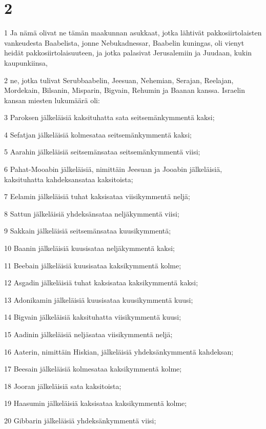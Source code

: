 \chapter{2}

\par 1 Ja nämä olivat ne tämän maakunnan asukkaat, jotka lähtivät pakkosiirtolaisten vankeudesta Baabelista, jonne Nebukadnessar, Baabelin kuningas, oli vienyt heidät pakkosiirtolaisuuteen, ja jotka palasivat Jerusalemiin ja Juudaan, kukin kaupunkiinsa,
\par 2 ne, jotka tulivat Serubbaabelin, Jeesuan, Nehemian, Serajan, Reelajan, Mordekain, Bilsanin, Misparin, Bigvain, Rehumin ja Baanan kanssa. Israelin kansan miesten lukumäärä oli:
\par 3 Paroksen jälkeläisiä kaksituhatta sata seitsemänkymmentä kaksi;
\par 4 Sefatjan jälkeläisiä kolmesataa seitsemänkymmentä kaksi;
\par 5 Aarahin jälkeläisiä seitsemänsataa seitsemänkymmentä viisi;
\par 6 Pahat-Mooabin jälkeläisiä, nimittäin Jeesuan ja Jooabin jälkeläisiä, kaksituhatta kahdeksansataa kaksitoista;
\par 7 Eelamin jälkeläisiä tuhat kaksisataa viisikymmentä neljä;
\par 8 Sattun jälkeläisiä yhdeksänsataa neljäkymmentä viisi;
\par 9 Sakkain jälkeläisiä seitsemänsataa kuusikymmentä;
\par 10 Baanin jälkeläisiä kuusisataa neljäkymmentä kaksi;
\par 11 Beebain jälkeläisiä kuusisataa kaksikymmentä kolme;
\par 12 Asgadin jälkeläisiä tuhat kaksisataa kaksikymmentä kaksi;
\par 13 Adonikamin jälkeläisiä kuusisataa kuusikymmentä kuusi;
\par 14 Bigvain jälkeläisiä kaksituhatta viisikymmentä kuusi;
\par 15 Aadinin jälkeläisiä neljäsataa viisikymmentä neljä;
\par 16 Aaterin, nimittäin Hiskian, jälkeläisiä yhdeksänkymmentä kahdeksan;
\par 17 Beesain jälkeläisiä kolmesataa kaksikymmentä kolme;
\par 18 Jooran jälkeläisiä sata kaksitoista;
\par 19 Haasumin jälkeläisiä kaksisataa kaksikymmentä kolme;
\par 20 Gibbarin jälkeläisiä yhdeksänkymmentä viisi;
